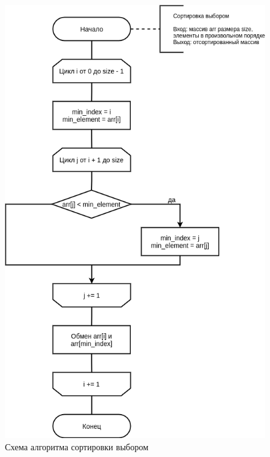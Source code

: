 \begin{figure}[H]
	\begin{center}
		\includegraphics[scale=0.4]{img/selection_sort.png}
	\end{center}
	\captionsetup{justification=centering}
	\caption{Схема алгоритма сортировки выбором}
	\label{img:selection_sort}
\end{figure}

